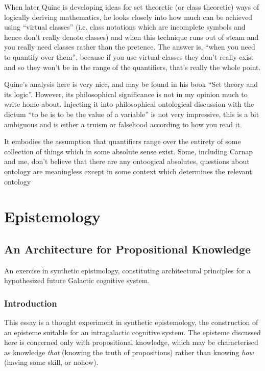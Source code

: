 \documentclass[10pt,titlepage]{book}
\begin{document}
When later Quine is developing ideas for set theoretic (or class theoretic) ways of logically deriving mathematics, he looks closely into how much can be achieved using ``virtual classes'' (i.e. class notations which are incomplete symbols and hence don't really denote classes) and when this technique runs out of steam and you really need classes rather than the pretence.
The answer is, ``when you need to quantify over them'', because if you use virtual classes they don't really exist and so they won't be in the range of the quantifiers, that's really the whole point.

Quine's analysis here is very nice, and may be found in his book ``Set theory and its logic''\cite{quineSTAIL}.
However, its philosophical significance is not in my opinion much to write home about.
Injecting it into philosophical ontological discussion with the dictum ``to be is to be the value of a variable'' is not very impressive, this is a bit ambiguous and is either a truism or falsehood according to how you read it.

It embodies the assumption that quantifiers range over the entirety of some collection of things which in some absolute sense exist.
Some, including Carnap and me, don't believe that there are any ontoogical absolutes, questions about ontology are meaningless except in some context which determines the relevant ontology

\part{Epistemology}

\chapter{An Architecture for Propositional Knowledge}

An exercise in synthetic epistmology, constituting architectural principles for a hypothesized future Galactic cognitive system.


\section{Introduction}

This essay is a thought experiment in synthetic epistemology, the construction of an episteme suitable for an intragalactic cognitive system.
The episteme discussed here is concerned only with propositional knowledge, which may be characterised as knowledge \emph{that} (knowing the truth of propositions) rather than knowing \emph{how} (having some skill, or nohow).
\end{document}
